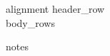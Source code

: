 \begin{table}[htbp]
\centering
\caption{{caption}}
\begin{tabular}{{alignment}}
\hline
{header_row} \\
\hline
{body_rows}
\hline
\end{tabular}
\par\smallskip\footnotesize {notes}
\end{table}
